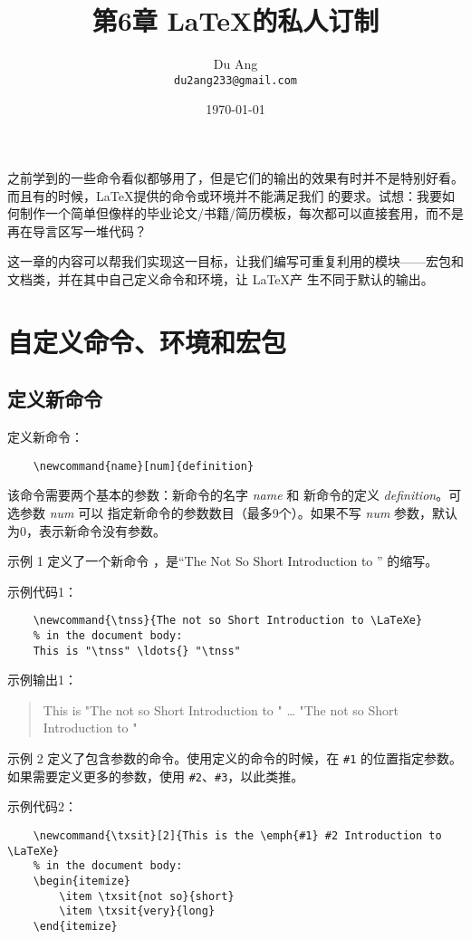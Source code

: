 \documentclass[UTF8]{ctexart}
\title{\heiti 第6章 \quad \LaTeX 的私人订制}
\author{\kaishu Du Ang \\ \texttt{du2ang233@gmail.com} }
\date{\today}
\begin{document}
\maketitle

\tableofcontents

\newpage

之前学到的一些命令看似都够用了，但是它们的输出的效果有时并不是特别好看。而且有的时候，\LaTeX 提供的命令或环境并不能满足我们
的要求。试想：我要如何制作一个简单但像样的毕业论文/书籍/简历模板，每次都可以直接套用，而不是再在导言区写一堆代码？

这一章的内容可以帮我们实现这一目标，让我们编写可重复利用的模块——宏包和文档类，并在其中自己定义命令和环境，让 \LaTeX 产
生不同于默认的输出。

\section{自定义命令、环境和宏包}
\subsection{定义新命令}
定义新命令：
\begin{verbatim}
    \newcommand{name}[num]{definition}
\end{verbatim}

该命令需要两个基本的参数：新命令的名字 \emph{name} 和 新命令的定义 \emph{definition}。可选参数 \emph{num} 可以
指定新命令的参数数目（最多9个）。如果不写 \emph{num} 参数，默认为0，表示新命令没有参数。

示例 1 定义了一个新命令 \texttt{\tnss}，是“The Not So Short Introduction to \LaTeXe” 的缩写。

示例代码1：
\begin{verbatim}
    \newcommand{\tnss}{The not so Short Introduction to \LaTeXe}
    % in the document body:
    This is "\tnss" \ldots{} "\tnss"
\end{verbatim}

示例输出1：
\begin{quote}
    \newcommand{\tnss}{The not so Short Introduction to \LaTeXe}
    This is "\tnss" \ldots{} "\tnss"
\end{quote}

示例 2 定义了包含参数的命令。使用定义的命令的时候，在 \texttt{\#1} 的位置指定参数。如果需要定义更多的参数，使用
\texttt{\#2}、\texttt{\#3}，以此类推。

示例代码2：
\begin{verbatim}
    \newcommand{\txsit}[2]{This is the \emph{#1} #2 Introduction to \LaTeXe}
    % in the document body:
    \begin{itemize}
        \item \txsit{not so}{short}
        \item \txsit{very}{long}
    \end{itemize}
\end{verbatim}
\end{document}
